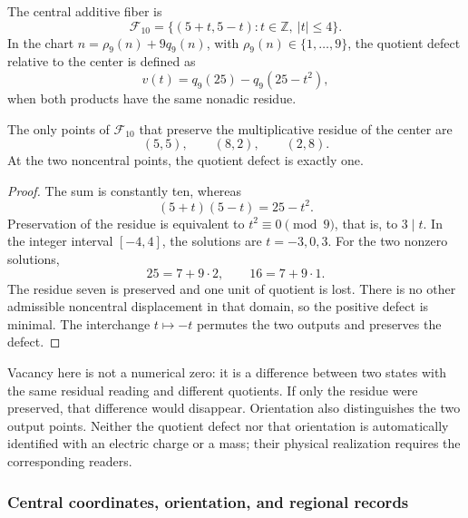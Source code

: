 \begin{definition}
The central additive fiber is
\[
 \mathcal F_{10}
 =\{(5+t,5-t):t\in\mathbb Z,\ |t|\leq4\}.
\]
In the chart \(n=\rho_9(n)+9q_9(n)\), with
\(\rho_9(n)\in\{1,\ldots,9\}\), the quotient defect relative
to the center is defined as
\[
 v(t)=q_9(25)-q_9(25-t^2),
\]
when both products have the same nonadic residue.
\end{definition}

\begin{lemma}
The only points of \(\mathcal F_{10}\) that preserve the
multiplicative residue of the center are
\[
 (5,5),\qquad (8,2),\qquad (2,8).
\]
At the two noncentral points, the quotient defect is exactly one.
\end{lemma}
\begin{proof}
The sum is constantly ten, whereas
\[
 (5+t)(5-t)=25-t^2.
\]
Preservation of the residue is equivalent to \(t^2\equiv0\pmod9\), that is,
to \(3\mid t\). In the integer interval \([-4,4]\), the solutions are
\(t=-3,0,3\). For the two nonzero solutions,
\[
 25=7+9\cdot2,\qquad16=7+9\cdot1.
\]
The residue seven is preserved and one unit of quotient is lost. There is
no other admissible noncentral displacement in that domain, so the
positive defect is minimal. The interchange \(t\mapsto-t\) permutes the
two outputs and preserves the defect.
\end{proof}

Vacancy here is not a numerical zero: it is a difference between two
states with the same residual reading and different quotients. If only
the residue were preserved, that difference would disappear.
Orientation also distinguishes the two output points. Neither the quotient
defect nor that orientation is automatically identified with an electric
charge or a mass; their physical realization requires the corresponding
readers.


\subsubsection{Central coordinates, orientation, and regional records}
\label{x_reciprocidad:el-centro:registros}

